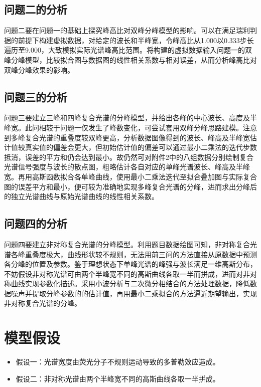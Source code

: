 \documentclass{article}
\numberwithin{equation}{subsection}
\begin{document}
\subsection{问题二的分析}
问题二要在问题一的基础上探究峰高比对双峰分峰模型的影响。可以在满足瑞利判据的前提下构建虚拟数据，对给定的波长和半峰宽，令峰高比从1.000以0.333步长遍历至9.000，大致模拟实际光谱峰高比范围。将构建的虚拟数据输入问题一的双峰分峰模型，比较拟合图与数据图的线性相关系数与相对误差，从而分析峰高比对双峰分峰效果的影响。

\subsection{问题三的分析}
问题三要建立三峰和四峰复合光谱的分峰模型，并给出各峰的中心波长、高度及半峰宽。此问相较于问题一仅发生了峰数变化，可尝试套用双峰分峰思路建模。注意到多峰复合光谱的重叠度较双峰更高，分析数据图像得到的波长、峰高及半峰宽估计值较真实值的偏差会更大，但初始估计值的偏差可以通过最小二乘法的迭代步数抵消，误差的平方和仍会达到最小。故仍然可对附件2中的八组数据分别绘制复合光谱信号强度与波长的散点图，粗略估计各自对应的单峰光谱波长、峰高及半峰宽。再用高斯函数拟合各单峰曲线，使用最小二乘法迭代至拟合叠加图与实际复合图的误差平方和最小，便可较为准确地实现多峰复合光谱的分峰，进而求出分峰后的独立光谱曲线与原始光谱曲线的线性相关系数。

\subsection{问题四的分析}

问题四要建立非对称复合光谱的分峰模型。利用题目数据绘图可知，非对称复合光谱各峰重叠度极大，曲线形状较不规则，无法用前三问的方法直接从原数据中预测各分峰的位置及参数。鉴于理想状态下单峰光谱的峰强与波长满足一维高斯分布，不妨假设非对称光谱可由两个半峰宽不同的高斯曲线各取一半而拼成，进而对非对称曲线实现参数化描述。采用小波分析与二次微分相结合的方法处理数据，降低数据噪声并提取分峰参数的的估计值，再用最小二乘拟合的方法逼近期望输出，实现非对称复合光谱的分峰。






{\centering\section{模型假设}}

\begin{itemize}
    \item 假设一：光谱宽度由荧光分子不规则运动导致的多普勒效应造成。
    \item 假设二：非对称光谱由两个半峰宽不同的高斯曲线各取一半拼成。
\end{itemize}
\end{document}
